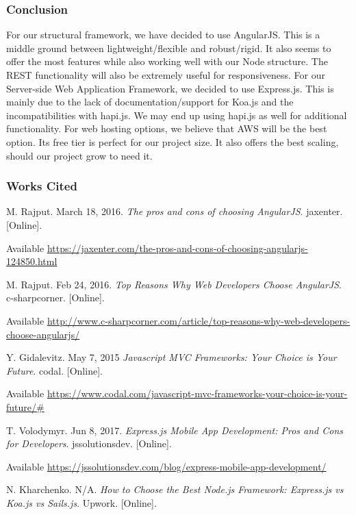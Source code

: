 			
\subsubsection{Conclusion}

For our structural framework, we have decided to use AngularJS. This is a middle ground between lightweight/flexible and robust/rigid. It also seems to offer the most features while also working well with our Node structure. The REST functionality will also be extremely useful for responsiveness. For our Server-side Web Application Framework, we decided to use Express.js. This is mainly due to the lack of documentation/support for Koa.js and the incompatibilities with hapi.js. We may end up using hapi.js as well for additional functionality. For web hosting options, we believe that AWS will be the best option. Its free tier is perfect for our project size. It also offers the best scaling, should our project grow to need it.

\pagebreak
	
\subsubsection{Works Cited} 



\cite{angularjsPC} M. Rajput. March 18, 2016. \textit{The pros and cons of choosing AngularJS}. jaxenter. [Online]. 

Available \url{https://jaxenter.com/the-pros-and-cons-of-choosing-angularjs-124850.html}

\cite{angularjs} M. Rajput. Feb 24, 2016. \textit{Top Reasons Why Web Developers Choose AngularJS}. c-sharpcorner. [Online]. 

Available \url{http://www.c-sharpcorner.com/article/top-reasons-why-web-developers-choose-angularjs/}

\cite{mvc} Y. Gidalevitz. May 7, 2015 \textit{Javascript MVC Frameworks: Your Choice is Your Future}. codal. [Online].  

Available \url{https://www.codal.com/javascript-mvc-frameworks-your-choice-is-your-future/#}

\cite{expressPC} T. Volodymyr. Jun 8, 2017. \textit{Express.js Mobile App Development: Pros and Cons for Developers}. jssolutionsdev. [Online].  

Available \url{https://jssolutionsdev.com/blog/express-mobile-app-development/}

\cite{expressKoaSails} N. Kharchenko. N/A. \textit{How to Choose the Best Node.js Framework: Express.js vs Koa.js vs Sails.js}. Upwork. [Online]. 

